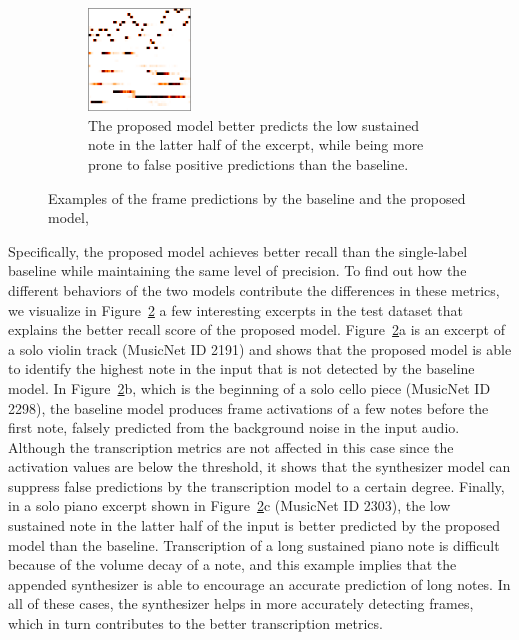 \begin{figure}
\begin{subfigure}[b]{\textwidth}
		\includegraphics[width=0.3\textwidth]{cropped/2303-proposed.png}
		\caption{The proposed model better predicts the low sustained note in the latter half of the excerpt, while being more prone to false positive predictions than the baseline.}
		\label{}
	\end{subfigure}
	\caption{Examples of the frame predictions by the baseline and the proposed model, }\label{fig:frame-prediction-excerpts}
\end{figure}

Specifically, the proposed model achieves better recall than the single-label baseline while maintaining the same level of precision.
To find out how the different behaviors of the two models contribute the differences in these metrics, we visualize in Figure~\ref{fig:frame-prediction-excerpts} a few interesting excerpts in the test dataset that explains the better recall score of the proposed model.
Figure~\ref{fig:frame-prediction-excerpts}a is an excerpt of a solo violin track (MusicNet ID 2191) and shows that the proposed model is able to identify the highest note in the input that is not detected by the baseline model.
In Figure~\ref{fig:frame-prediction-excerpts}b, which is the beginning of a solo cello piece (MusicNet ID 2298), the baseline model produces frame activations of a few notes before the first note, falsely predicted from the background noise in the input audio.
Although the transcription metrics are not affected in this case since the activation values are below the threshold, it shows that the synthesizer model can suppress false predictions by the transcription model to a certain degree.
Finally, in a solo piano excerpt shown in Figure~\ref{fig:frame-prediction-excerpts}c (MusicNet ID 2303), the low sustained note in the latter half of the input is better predicted by the proposed model than the baseline.
Transcription of a long sustained piano note is difficult because of the volume decay of a note, and this example implies that the appended synthesizer is able to encourage an accurate prediction of long notes.
In all of these cases, the synthesizer helps in more accurately detecting frames, which in turn contributes to the better transcription metrics.


